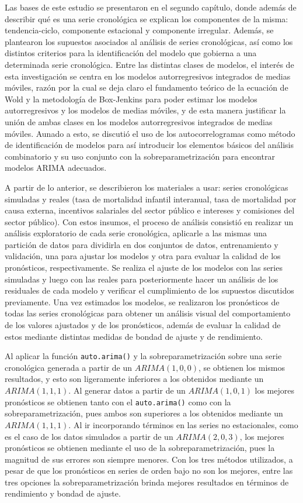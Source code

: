 \documentclass[
]{article}
\begin{document}
Las bases de este estudio se presentaron en el segundo capítulo, donde
además de describir qué es una serie cronológica se explican los
componentes de la misma: tendencia-ciclo, componente estacional y
componente irregular. Además, se plantearon los supuestos asociados al
análisis de series cronológicas, así como los distintos criterios para
la identificación del modelo que gobierna a una determinada serie
cronológica. Entre las distintas clases de modelos, el interés de esta
investigación se centra en los modelos autorregresivos integrados de
medias móviles, razón por la cual se deja claro el fundamento teórico de
la ecuación de Wold y la metodología de Box-Jenkins para poder estimar
los modelos autorregresivos y los modelos de medias móviles, y de esta
manera justificar la unión de ambas clases en los modelos
autorregresivos integrados de medias móviles. Aunado a esto, se discutió
el uso de los autocorrelogramas como método de identificación de modelos
para así introducir los elementos básicos del análisis combinatorio y su
uso conjunto con la sobreparametrización para encontrar modelos ARIMA
adecuados.

A partir de lo anterior, se describieron los materiales a usar: series
cronológicas simuladas y reales (tasa de mortalidad infantil interanual,
tasa de mortalidad por causa externa, incentivos salariales del sector
público e intereses y comisiones del sector público). Con estos insumos,
el proceso de análisis consistió en realizar un análisis exploratorio de
cada serie cronológica, aplicarle a las mismas una partición de datos
para dividirla en dos conjuntos de datos, entrenamiento y validación,
una para ajustar los modelos y otra para evaluar la calidad de los
pronósticos, respectivamente. Se realiza el ajuste de los modelos con
las series simuladas y luego con las reales para posteriormente hacer un
análisis de los residuales de cada modelo y verificar el cumplimiento de
los supuestos discutidos previamente. Una vez estimados los modelos, se
realizaron los pronósticos de todas las series cronológicas para obtener
un análisis visual del comportamiento de los valores ajustados y de los
pronósticos, además de evaluar la calidad de estos mediante distintas
medidas de bondad de ajuste y de rendimiento.

Al aplicar la función \texttt{auto.arima()} y la sobreparametrización
sobre una serie cronológica generada a partir de un \(ARIMA(1,0,0)\), se
obtienen los mismos resultados, y esto son ligeramente inferiores a los
obtenidos mediante un \(ARIMA(1,1,1)\). Al generar datos a partir de un
\(ARIMA(1,0,1)\) los mejores pronósticos se obtienen tanto con el
\texttt{auto.arima()} como con la sobreparametrización, pues ambos son
superiores a los obtenidos mediante un \(ARIMA(1,1,1)\). Al ir
incorporando términos en las series no estacionales, como es el caso de
los datos simulados a partir de un \(ARIMA(2,0,3)\), los mejores
pronósticos se obtienen mediante el uso de la sobreparametrización, pues
la magnitud de sus errores son siempre menores. Con los tres métodos
utilizados, a pesar de que los pronósticos en series de orden bajo no
son los mejores, entre las tres opciones la sobreparametrización brinda
mejores resultados en términos de rendimiento y bondad de ajuste.
\end{document}
